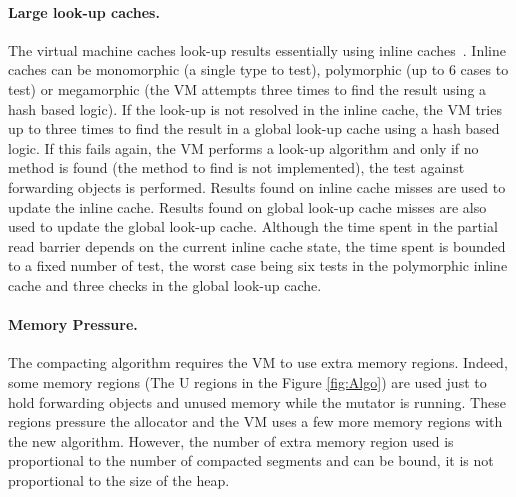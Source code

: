 \documentclass[sigplan,10pt,review,anonymous]{acmart}\settopmatter{printfolios=true,printccs=false,printacmref=false}
\newcommand{\todo}[1]{\color{orange}\fbox{\bfseries\sffamily\scriptsize TODO:}{\sf\small$\blacktriangleright$\textit{#1}$\blacktriangleleft$}\color{black}}
\begin{document}


\paragraph{Large look-up caches.}
The virtual machine caches look-up results essentially using inline caches~\cite{PICSelf}. Inline caches can be monomorphic (a single type to test), polymorphic (up to 6 cases to test) or megamorphic (the VM attempts three times to find the result using a hash based logic). If the look-up is not resolved in the inline cache, the VM tries up to three times to find the result in a global look-up cache using a hash based logic. If this fails again, the VM performs a look-up algorithm and only if no method is found (the method to find is not implemented), the test against forwarding objects is performed. Results found on inline cache misses are used to update the inline cache. Results found on global look-up cache misses are also used to update the global look-up cache. Although the time spent in the partial read barrier depends on the current inline cache state, the time spent is bounded to a fixed number of test, the worst case being six tests in the polymorphic inline cache and three checks in the global look-up cache. 

\paragraph{Memory Pressure.}
The compacting algorithm requires the VM to use extra memory regions. Indeed, some memory regions (The U regions in the Figure \ref{fig:Algo}) are used just to hold forwarding objects and unused memory while the mutator is running. These regions pressure the allocator and the VM uses a few more memory regions with the new algorithm. However, the number of extra memory region used is proportional to the number of compacted segments and can be bound, it is not proportional to the size of the heap. %
\end{document}
